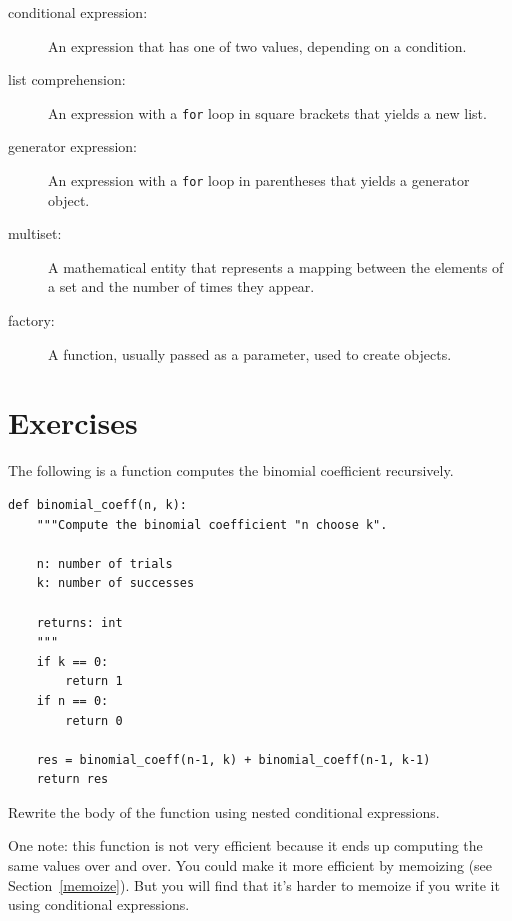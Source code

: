 \documentclass[10pt]{book}
\begin{document}
\begin{description}

\item[conditional expression:] An expression that has one of two
values, depending on a condition.

\item[list comprehension:] An expression with a {\tt for} loop in square
brackets that yields a new list.

\item[generator expression:] An expression with a {\tt for} loop in parentheses
that yields a generator object.

\item[multiset:] A mathematical entity that represents a mapping
between the elements of a set and the number of times they appear.

\item[factory:] A function, usually passed as a parameter, used to
create objects.

\end{description}




\section{Exercises}

\begin{exercise}

The following is a function computes the binomial
coefficient recursively.

\begin{verbatim}
def binomial_coeff(n, k):
    """Compute the binomial coefficient "n choose k".

    n: number of trials
    k: number of successes

    returns: int
    """
    if k == 0:
        return 1
    if n == 0:
        return 0

    res = binomial_coeff(n-1, k) + binomial_coeff(n-1, k-1)
    return res
\end{verbatim}

Rewrite the body of the function using nested conditional
expressions.

One note: this function is not very efficient because it ends up computing
the same values over and over.  You could make it more efficient by
memoizing (see Section~\ref{memoize}).  But you will find that it's harder to
memoize if you write it using conditional expressions.

\end{exercise}
\end{document}
